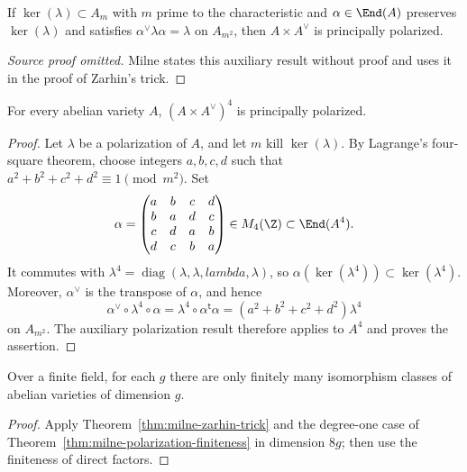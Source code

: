 \begin{corollary}\label{cor:milne-zarhin-auxiliary}
If $\ker(\lambda)\subset A_m$ with $m$ prime to the characteristic and $\alpha\in\End(A)$ preserves $\ker(\lambda)$ and satisfies $\alpha^\vee\lambda\alpha=\lambda$ on $A_{m^2}$, then $A\times A^\vee$ is principally polarized.
\end{corollary}
\begin{proof}[Source proof omitted]
Milne states this auxiliary result without proof and uses it in the proof of
Zarhin's trick.
\end{proof}
\begin{theorem}\label{thm:milne-zarhin-trick}
For every abelian variety $A$, $(A\times A^\vee)^4$ is principally polarized.
\end{theorem}

\begin{proof}
Let $\lambda$ be a polarization of $A$, and let $m$ kill $\ker(\lambda)$.
By Lagrange's four-square theorem, choose integers $a,b,c,d$ such that
$a^2+b^2+c^2+d^2\equiv1\pmod {m^2}$.  Set
\[
\alpha=\begin{pmatrix}
a&b&c&d\\ b&a&d&c\\ c&d&a&b\\ d&c&b&a
\end{pmatrix}\in M_4(\Z)\subset\End(A^4).
\]
It commutes with $\lambda^4=\operatorname{diag}(\lambda,\lambda,lambda,\lambda)$,
so $\alpha(\ker(\lambda^4))\subset\ker(\lambda^4)$.  Moreover, $\alpha^\vee$
is the transpose of $\alpha$, and hence
\[
\alpha^\vee\circ\lambda^4\circ\alpha
=\lambda^4\circ\alpha^{\mathsf t}\alpha
=(a^2+b^2+c^2+d^2)\lambda^4
\]
on $A_{m^2}$.  The auxiliary polarization result therefore applies to
$A^4$ and proves the assertion.
\end{proof}

\begin{corollary}\label{cor:milne-finite-abelian-varieties}
Over a finite field, for each $g$ there are only finitely many isomorphism classes of abelian varieties of dimension $g$.
\end{corollary}

\begin{proof}

Apply Theorem~\ref{thm:milne-zarhin-trick} and the degree-one case of Theorem~\ref{thm:milne-polarization-finiteness} in dimension $8g$; then use the finiteness of direct factors.

\end{proof}


